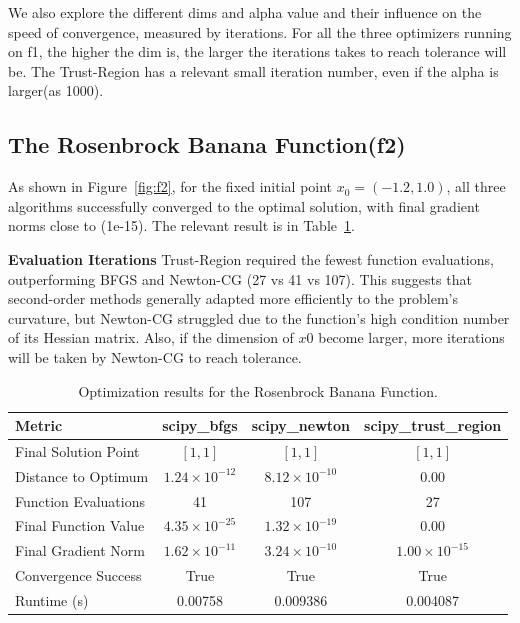 \documentclass[12pt]{article}
\begin{document}
We also explore the different dims and alpha value and their influence on the speed of convergence, measured by iterations. For all the three optimizers running on f1, the higher the dim is, the larger the iterations takes to reach tolerance will be. The Trust-Region has a relevant small iteration number, even if the alpha is larger(as 1000).


\subsection{The Rosenbrock Banana Function(f2)}

As shown in Figure~\ref{fig:f2}, for the fixed initial point $x_0=(-1.2,1.0)$, all three algorithms successfully converged to the optimal solution, with final gradient norms close to (1e-15). The relevant result is in Table~\ref{tab:f2}.

\textbf{Evaluation Iterations}  
Trust-Region required the fewest function evaluations, outperforming BFGS and Newton-CG (27 vs 41 vs 107). This suggests that second-order methods generally adapted more efficiently to the problem’s curvature, but Newton-CG struggled due to the function's high condition number of its Hessian matrix. Also, if the dimension of $x0$ become larger, more iterations will be taken by Newton-CG to reach tolerance.


\begin{table}[h]
    \centering
\begin{tabular}{lccc}
    \toprule
    Metric & scipy\_bfgs & scipy\_newton & scipy\_trust\_region \\
    \midrule
    Final Solution Point & $[1, 1]$ & $[1, 1]$ & $[1, 1]$ \\
    Distance to Optimum & $1.24\times10^{-12}$ & $8.12\times10^{-10}$ & $0.00$ \\
    Function Evaluations & 41 & 107 & 27 \\
    Final Function Value & $4.35\times10^{-25}$ & $1.32\times10^{-19}$ & $0.00$ \\
    Final Gradient Norm & $1.62\times10^{-11}$ & $3.24\times10^{-10}$ & $1.00\times10^{-15}$ \\
    Convergence Success & True & True & True \\
    Runtime (s) & 0.00758 & 0.009386 & 0.004087 \\
    \bottomrule
\end{tabular}
    \caption{Optimization results for the Rosenbrock Banana Function.}
    \label{tab:f2}
\end{table}
\end{document}
